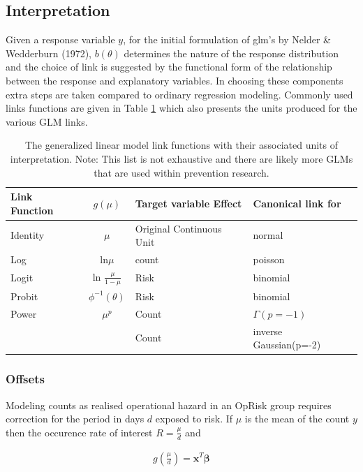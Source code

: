 \documentclass{DissertateUSU}
\begin{document}
\subsection{Interpretation}

Given a response variable \(y\), for the initial formulation of glm's by
Nelder \& Wedderburn (1972), \(b(\theta)\) determines the nature of the
response distribution and the choice of link is suggested by the
functional form of the relationship between the response and explanatory
variables. In choosing these components extra steps are taken compared
to ordinary regression modeling. Commonly used links functions are given
in Table \ref{tab_linkfcn} which also presents the units produced for
the various GLM links.

\begin{table}[tb]
\centering
\caption{The generalized linear model link functions with their associated units of interpretation. Note: This list is not exhaustive and there are likely more GLMs that are used within prevention research.} 
\label{tab_linkfcn}
\begin{tabular}{lcll}
\toprule
Link Function & $g(\mu)$ & Target variable Effect & Canonical link for \\ 
\midrule
Identity & $\mu$ & Original Continuous Unit & normal \\ 
  Log & ln$\mu$ & count & poisson \\ 
  Logit & ln $\frac{\mu}{1-\mu}$ & Risk & binomial \\ 
  Probit & $\phi^{-1}(\theta)$ & Risk & binomial \\ 
  Power & $\mu^p$ & Count & $\Gamma(p=-1)$\\
        &       & Count & inverse Gaussian(p=-2)\\
\bottomrule
\end{tabular}
\end{table}

\subsubsection{Offsets}

Modeling counts as realised operational hazard in an OpRisk group
requires correction for the period in days \(d\) exposed to risk. If
\(\mu\) is the mean of the count \(y\) then the occurence rate of
interest \(R= \frac{\mu}{d}\) and

\singlespacing

\begin{eqnarray}
g\left(\frac{\mu}{d}\right) = \mathbf{x}^T\mathbf{\beta}
\end{eqnarray} \doublespacing
\end{document}

